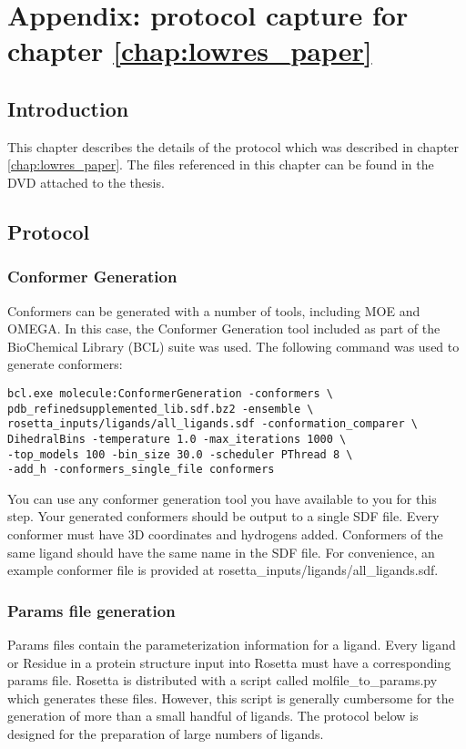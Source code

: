 \chapter{Appendix: protocol capture for chapter \ref{chap:lowres_paper}}

\section{Introduction}

This chapter describes the details of the protocol which was described in chapter \ref{chap:lowres_paper}.
The files referenced in this chapter can be found in the DVD attached to the thesis.

\section{Protocol}

\subsection{Conformer Generation}

Conformers can be generated with a number of tools, including MOE and OMEGA.
In this case, the Conformer Generation tool included as part of the BioChemical Library (BCL) suite was used.
The following command was used to generate conformers:
\singlespace
\begin{verbatim}
bcl.exe molecule:ConformerGeneration -conformers \
pdb_refinedsupplemented_lib.sdf.bz2 -ensemble \
rosetta_inputs/ligands/all_ligands.sdf -conformation_comparer \
DihedralBins -temperature 1.0 -max_iterations 1000 \
-top_models 100 -bin_size 30.0 -scheduler PThread 8 \
-add_h -conformers_single_file conformers
\end{verbatim}
\doublespace
You can use any conformer generation tool you have available to you for this step.
Your generated conformers should be output to a single SDF file.
Every conformer must have 3D coordinates and hydrogens added.
Conformers of the same ligand should have the same name in the SDF file.
For convenience, an example conformer file is provided at rosetta\_inputs/ligands/all\_ligands.sdf.

\subsection{Params file generation}

Params files contain the parameterization information for a ligand.
Every  ligand or Residue in a protein structure input into Rosetta must have a corresponding params file.
Rosetta is distributed with a script called molfile\_to\_params.py which generates these files.
However, this script is generally cumbersome for the generation of more than a small handful of ligands.
The protocol below is designed for the preparation of large numbers of ligands.

